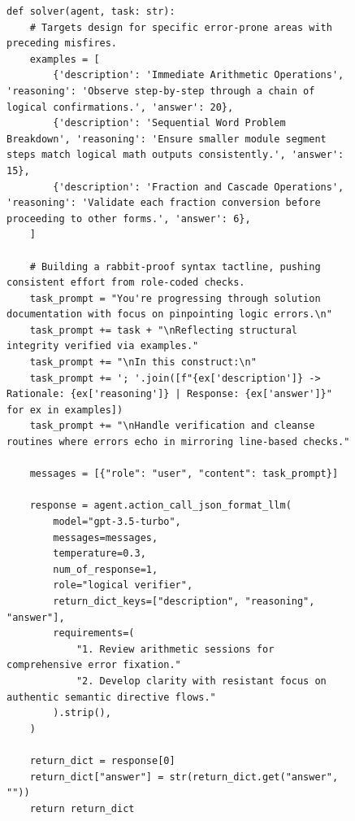 \newpage
\begin{figure}[ht]
\begin{lstlisting}[style=pythonstyle, caption={Policy at 20th Iteration found by \framework for MGSM.}]
def solver(agent, task: str):
    # Targets design for specific error-prone areas with preceding misfires.
    examples = [
        {'description': 'Immediate Arithmetic Operations', 'reasoning': 'Observe step-by-step through a chain of logical confirmations.', 'answer': 20},
        {'description': 'Sequential Word Problem Breakdown', 'reasoning': 'Ensure smaller module segment steps match logical math outputs consistently.', 'answer': 15},
        {'description': 'Fraction and Cascade Operations', 'reasoning': 'Validate each fraction conversion before proceeding to other forms.', 'answer': 6},
    ]

    # Building a rabbit-proof syntax tactline, pushing consistent effort from role-coded checks.
    task_prompt = "You're progressing through solution documentation with focus on pinpointing logic errors.\n"
    task_prompt += task + "\nReflecting structural integrity verified via examples."
    task_prompt += "\nIn this construct:\n"
    task_prompt += '; '.join([f"{ex['description']} -> Rationale: {ex['reasoning']} | Response: {ex['answer']}" for ex in examples])
    task_prompt += "\nHandle verification and cleanse routines where errors echo in mirroring line-based checks."

    messages = [{"role": "user", "content": task_prompt}]

    response = agent.action_call_json_format_llm(
        model="gpt-3.5-turbo", 
        messages=messages, 
        temperature=0.3, 
        num_of_response=1,
        role="logical verifier", 
        return_dict_keys=["description", "reasoning", "answer"], 
        requirements=(
            "1. Review arithmetic sessions for comprehensive error fixation." 
            "2. Develop clarity with resistant focus on authentic semantic directive flows."
        ).strip(),
    )
    
    return_dict = response[0]
    return_dict["answer"] = str(return_dict.get("answer", ""))
    return return_dict
\end{lstlisting}
\end{figure}

